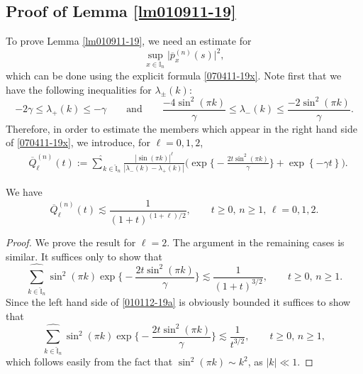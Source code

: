 \documentclass[EJP]{ejpecp} %
\newcommand\T{{\mathbb I}}
\newcommand \ga{\gamma}
\newcommand \la{\lambda}
\renewcommand{\ge}{\geqslant}
\renewcommand{\hat}{\widehat}
\renewcommand{\bar}{\overline}
\numberwithin{equation}{section}
\begin{document}
\subsection{Proof of Lemma \ref{lm010911-19}} 




\label{sec7bis}

To prove Lemma \ref{lm010911-19}, we need an estimate for 
\[ \sup_{x\in\T_n}\big|\bar p^{(n)}_{x}(s)\big|^2,\] which can be done using the explicit formula \eqref{070411-19x}.
Note first that we have the following inequalities for $\lambda_\pm(k)$: 
\[-2\gamma \leqslant \lambda_+(k) \leqslant - \gamma  \qquad \text{and} \qquad \frac{-4\sin^2(\pi k)}{\gamma} \leqslant \lambda_-(k) \leqslant \frac{-2 \sin^2(\pi k)}{\gamma}.\]
Therefore, in order to estimate the members which appear in the right hand side of \eqref{070411-19x}, we introduce, for $\ell=0,1,2$,
\begin{align*}
&
\bar Q_\ell^{(n)}(t):= \underset{{k\in \widehat{\T}_n}}{{\hat\sum}}\frac{|\sin(\pi
  k)|^{\ell}}{|\la_-(k)-\la_+(k)| }  \Big(\exp\Big\{-\frac{2t\sin^2(\pi
  k)}{\ga}\Big\}+\exp\left\{-\ga t\right\}\Big).
\end{align*}
\begin{lemma}
\label{lm010112-19}
We have
\begin{equation}
\label{010112-19}
\bar Q_\ell^{(n)}(t)\lesssim
\frac{1}{(1+t)^{(1+\ell)/2}},\qquad t\ge0,\,n\ge1,\,\ell=0,1,2.
\end{equation}
\end{lemma}
\begin{proof} We prove the result for $\ell=2$. The argument in the remaining
cases is similar.
It suffices only to show that 
\begin{equation}
\label{010112-19a}
\underset{{k\in \widehat{\T}_n}}{{\hat\sum}}\sin^2(\pi
  k) \exp\Big\{-\frac{2t\sin^2(\pi
  k)}{\ga}\Big\}\lesssim
\frac{1}{(1+t)^{3/2}},\qquad t\ge0,\,n\ge 1.
\end{equation}
Since the left hand side of \eqref{010112-19a} is obviously bounded it
suffices to show that 
\begin{equation}
\label{010112-19b}
\underset{{k\in \widehat{\T}_n}}{{\hat\sum}}\sin^2(\pi
  k) \exp\Big\{-\frac{2t\sin^2(\pi
  k)}{\ga}\Big\}\lesssim
\frac{1}{t^{3/2}}, \qquad t\ge0,\,n\ge 1,
\end{equation}
which follows easily from the fact that  $\sin^2(\pi
  k)\sim k^2$, as $|k|\ll 1$.
\end{proof}
\end{document}
